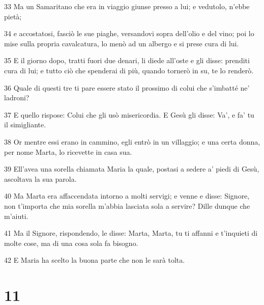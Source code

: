 \par 33 Ma un Samaritano che era in viaggio giunse presso a lui; e vedutolo, n'ebbe pietà;
\par 34 e accostatosi, fasciò le sue piaghe, versandovi sopra dell'olio e del vino; poi lo mise sulla propria cavalcatura, lo menò ad un albergo e si prese cura di lui.
\par 35 E il giorno dopo, tratti fuori due denari, li diede all'oste e gli disse: prenditi cura di lui; e tutto ciò che spenderai di più, quando tornerò in su, te lo renderò.
\par 36 Quale di questi tre ti pare essere stato il prossimo di colui che s'imbatté ne' ladroni?
\par 37 E quello rispose: Colui che gli usò misericordia. E Gesù gli disse: Va', e fa' tu il simigliante.
\par 38 Or mentre essi erano in cammino, egli entrò in un villaggio; e una certa donna, per nome Marta, lo ricevette in casa sua.
\par 39 Ell'avea una sorella chiamata Maria la quale, postasi a sedere a' piedi di Gesù, ascoltava la sua parola.
\par 40 Ma Marta era affaccendata intorno a molti servigi; e venne e disse: Signore, non t'importa che mia sorella m'abbia lasciata sola a servire? Dille dunque che m'aiuti.
\par 41 Ma il Signore, rispondendo, le disse: Marta, Marta, tu ti affanni e t'inquieti di molte cose, ma di una cosa sola fa bisogno.
\par 42 E Maria ha scelto la buona parte che non le sarà tolta.

\chapter{11}


